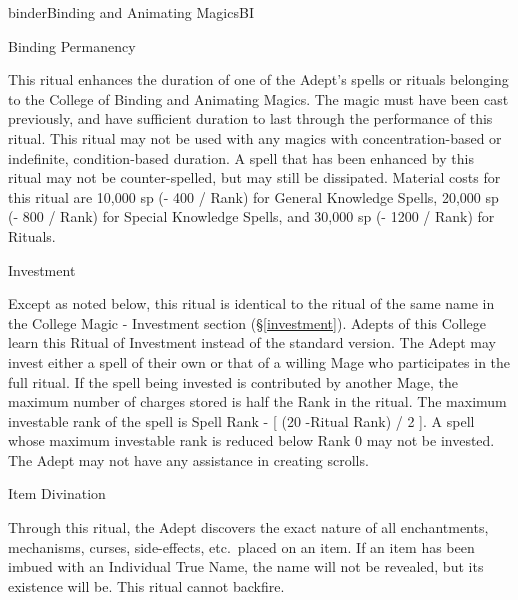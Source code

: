 \begin{college}[1.1]{binder}{Binding and Animating Magics}{BI}
\begin{ritual}[R-1]{Binding Permanency}
\begin{effects}
This ritual enhances the duration of one of the Adept's spells or
rituals belonging to the College of Binding and Animating Magics.  The
magic must have been cast previously, and have sufficient duration to
last through the performance of this ritual. This ritual may not be
used with any magics with concentration-based or indefinite,
condition-based duration. A spell that has been enhanced by this
ritual may not be counter-spelled, but may still be dissipated.
Material costs for this ritual are 10,000 sp (- 400 / Rank) for
General Knowledge Spells, 20,000 sp (- 800 / Rank) for Special
Knowledge Spells, and 30,000 sp (- 1200 / Rank) for Rituals.
\end{effects}
\end{ritual}

\begin{ritual}[R-2]{Investment}

\begin{effects}
Except as noted below, this ritual is identical to the ritual of the
same name in the College Magic - Investment section
(\S\ref{investment}). Adepts of this College learn this Ritual of
Investment instead of the standard version. The Adept may invest
either a spell of their own or that of a willing Mage who participates
in the full ritual. If the spell being invested is contributed by
another Mage, the maximum number of charges stored is half the Rank in
the ritual. The maximum investable rank of the spell is Spell Rank - [
(20 -Ritual Rank) / 2 ]. A spell whose maximum investable rank is
reduced below Rank 0 may not be invested. The Adept may not have any
assistance in creating scrolls.
\end{effects}
\end{ritual}

\begin{ritual}[R-3]{Item Divination}

\begin{effects}
Through this ritual, the Adept discovers the exact nature of all
enchantments, mechanisms, curses, side-effects, etc.\ placed on an
item.  If an item has been imbued with an Individual True Name, the
name will not be revealed, but its existence will be.  This ritual
cannot backfire.
\end{effects}
\end{ritual}


\end{college}
